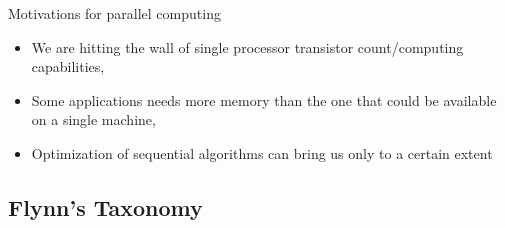 \documentclass[xcolor={svgnames,usenames}]{beamer}
\begin{document}
\begin{frame}{Motivations for parallel computing}
\begin{itemize}
\item<1-> We are hitting the wall of single processor transistor count/computing capabilities,
\item<2-> Some applications needs more memory than the one that could be available on a single machine,
\item<3-> Optimization of sequential algorithms can bring us only to a certain extent
\end{itemize}


\end{frame}

\subsection{Flynn's Taxonomy}
\end{document}
